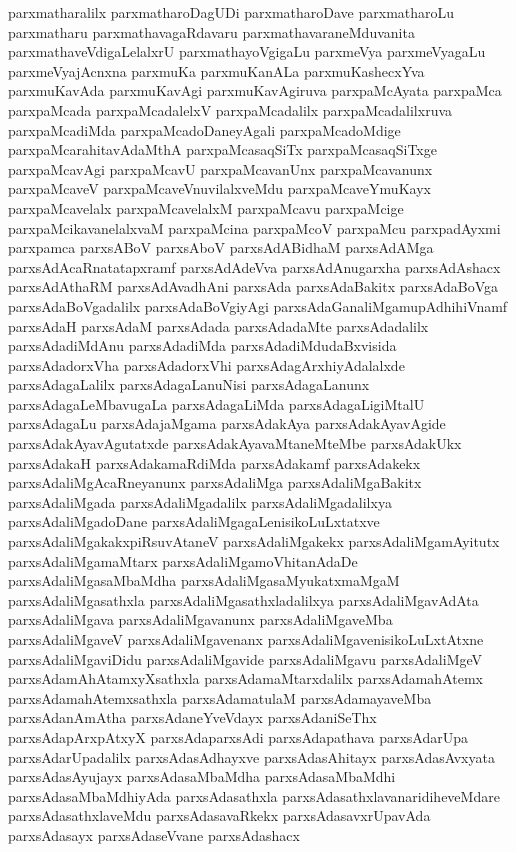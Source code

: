 {parxmatharalilx
parxmatharoDagUDi
parxmatharoDave
parxmatharoLu
parxmatharu
parxmathavagaRdavaru
parxmathavaraneMduvanita
parxmathaveVdigaLelalxrU
parxmathayoVgigaLu
parxmeVya
parxmeVyagaLu
parxmeVyajAcnxna
parxmuKa
parxmuKanALa
parxmuKashecxYva
parxmuKavAda
parxmuKavAgi
parxmuKavAgiruva
parxpaMcAyata
parxpaMca
parxpaMcada
parxpaMcadalelxV
parxpaMcadalilx
parxpaMcadalilxruva
parxpaMcadiMda
parxpaMcadoDaneyAgali
parxpaMcadoMdige
parxpaMcarahitavAdaMthA
parxpaMcasaqSiTx
parxpaMcasaqSiTxge
parxpaMcavAgi
parxpaMcavU
parxpaMcavanUnx
parxpaMcavanunx
parxpaMcaveV
parxpaMcaveVnuvilalxveMdu
parxpaMcaveYmuKayx
parxpaMcavelalx
parxpaMcavelalxM
parxpaMcavu
parxpaMcige
parxpaMcikavanelalxvaM
parxpaMcina
parxpaMcoV
parxpaMcu
parxpadAyxmi
parxpamca
parxsABoV
parxsAboV
parxsAdABidhaM
parxsAdAMga
parxsAdAcaRnatatapxramf
parxsAdAdeVva
parxsAdAnugarxha
parxsAdAshacx
parxsAdAthaRM
parxsAdAvadhAni
parxsAda
parxsAdaBakitx
parxsAdaBoVga
parxsAdaBoVgadalilx
parxsAdaBoVgiyAgi
parxsAdaGanaliMgamupAdhihiVnamf
parxsAdaH
parxsAdaM
parxsAdada
parxsAdadaMte
parxsAdadalilx
parxsAdadiMdAnu
parxsAdadiMda
parxsAdadiMdudaBxvisida
parxsAdadorxVha
parxsAdadorxVhi
parxsAdagArxhiyAdalalxde
parxsAdagaLalilx
parxsAdagaLanuNisi
parxsAdagaLanunx
parxsAdagaLeMbavugaLa
parxsAdagaLiMda
parxsAdagaLigiMtalU
parxsAdagaLu
parxsAdajaMgama
parxsAdakAya
parxsAdakAyavAgide
parxsAdakAyavAgutatxde
parxsAdakAyavaMtaneMteMbe
parxsAdakUkx
parxsAdakaH
parxsAdakamaRdiMda
parxsAdakamf
parxsAdakekx
parxsAdaliMgAcaRneyanunx
parxsAdaliMga
parxsAdaliMgaBakitx
parxsAdaliMgada
parxsAdaliMgadalilx
parxsAdaliMgadalilxya
parxsAdaliMgadoDane
parxsAdaliMgagaLenisikoLuLxtatxve
parxsAdaliMgakakxpiRsuvAtaneV
parxsAdaliMgakekx
parxsAdaliMgamAyitutx
parxsAdaliMgamaMtarx
parxsAdaliMgamoVhitanAdaDe
parxsAdaliMgasaMbaMdha
parxsAdaliMgasaMyukatxmaMgaM
parxsAdaliMgasathxla
parxsAdaliMgasathxladalilxya
parxsAdaliMgavAdAta
parxsAdaliMgava
parxsAdaliMgavanunx
parxsAdaliMgaveMba
parxsAdaliMgaveV
parxsAdaliMgavenanx
parxsAdaliMgavenisikoLuLxtAtxne
parxsAdaliMgaviDidu
parxsAdaliMgavide
parxsAdaliMgavu
parxsAdaliMgeV
parxsAdamAhAtamxyXsathxla
parxsAdamaMtarxdalilx
parxsAdamahAtemx
parxsAdamahAtemxsathxla
parxsAdamatulaM
parxsAdamayaveMba
parxsAdanAmAtha
parxsAdaneYveVdayx
parxsAdaniSeThx
parxsAdapArxpAtxyX
parxsAdaparxsAdi
parxsAdapathava
parxsAdarUpa
parxsAdarUpadalilx
parxsAdasAdhayxve
parxsAdasAhitayx
parxsAdasAvxyata
parxsAdasAyujayx
parxsAdasaMbaMdha
parxsAdasaMbaMdhi
parxsAdasaMbaMdhiyAda
parxsAdasathxla
parxsAdasathxlavanaridiheveMdare
parxsAdasathxlaveMdu
parxsAdasavaRkekx
parxsAdasavxrUpavAda
parxsAdasayx
parxsAdaseVvane
parxsAdashacx
}
